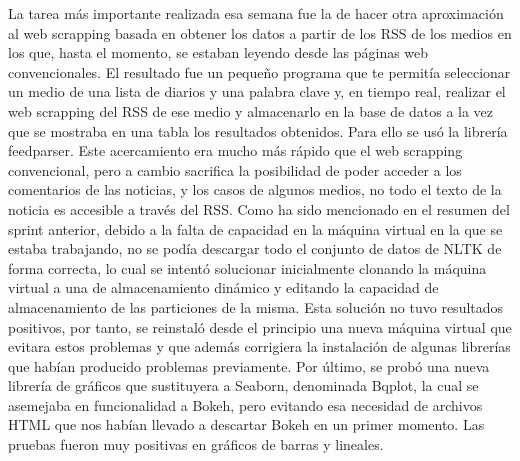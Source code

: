 La tarea más importante realizada esa semana fue la de hacer otra aproximación al web scrapping basada en obtener los datos a partir de los RSS de los medios en los que, hasta el momento, se estaban leyendo desde las páginas web convencionales. El resultado fue un pequeño programa que te permitía seleccionar un medio de una lista de diarios y una palabra clave y, en tiempo real, realizar el web scrapping del RSS de ese medio y almacenarlo en la base de datos a la vez que se mostraba en una tabla los resultados obtenidos. Para ello se usó la librería feedparser.
Este acercamiento era mucho más rápido que el web scrapping convencional, pero a cambio sacrifica la posibilidad de poder acceder a los comentarios de las noticias, y los casos de algunos medios, no todo el texto de la noticia es accesible a través del RSS.
Como ha sido mencionado en el resumen del sprint anterior, debido a la falta de capacidad en la máquina virtual en la que se estaba trabajando, no se podía descargar todo el conjunto de datos de NLTK de forma correcta, lo cual se intentó solucionar inicialmente clonando la máquina virtual a una de almacenamiento dinámico y editando la capacidad de almacenamiento de las particiones de la misma. 
Esta solución no tuvo resultados positivos, por tanto, se reinstaló desde el principio una nueva máquina virtual que evitara estos problemas y que además corrigiera la instalación de algunas librerías que habían producido problemas previamente.
Por último, se probó una nueva librería de gráficos que sustituyera a Seaborn, denominada Bqplot, la cual se asemejaba en funcionalidad a Bokeh, pero evitando esa necesidad de archivos HTML que nos habían llevado a descartar Bokeh en un primer momento. Las pruebas fueron muy positivas en gráficos de barras y lineales.

